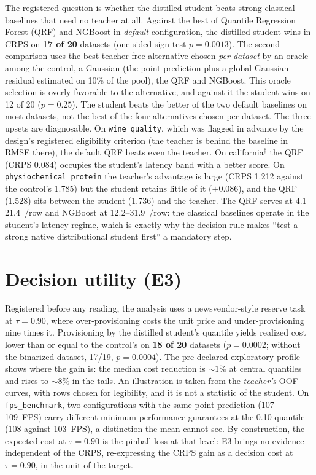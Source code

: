 The registered question is whether the distilled student beats
strong classical baselines that need no teacher at all. Against the
best of Quantile Regression Forest (QRF) and NGBoost in
\emph{default} configuration, the distilled student wins in CRPS on
\textbf{17 of 20} datasets (one-sided sign test $p=0.0013$). The
second comparison uses the best teacher-free alternative chosen
\emph{per dataset} by an oracle among the control, a
Gaussian (the point prediction plus a global Gaussian residual
estimated on 10\% of the pool), the QRF and NGBoost. This oracle
selection is overly favorable to the alternative, and against it the
student wins on 12 of 20 ($p=0.25$). The student beats the better of the two default baselines on most datasets, not the best of the four alternatives chosen per dataset. The three upsets are diagnosable. On
\texttt{wine\_quality}, which was flagged in advance by the design's registered
eligibility criterion (the teacher is behind the baseline in RMSE there),
the default QRF beats even the teacher. On california$^\dagger$ the QRF (CRPS 0.084) occupies
the student's latency band with a better score. On
\texttt{physiochemical\_\allowbreak protein} the teacher's advantage
is large (CRPS 1.212 against the control's 1.785) but the student
retains little of it ($+0.086$), and the QRF (1.528) sits between
the student (1.736) and the teacher. The QRF serves at
4.1--21.4~\us/row and NGBoost at 12.2--31.9~\us/row: the
classical baselines operate in the student's latency regime, which
is exactly why the decision rule makes ``test a strong native distributional student first'' a mandatory step.

\section{Decision utility (E3)}
\label{sec:destil-e3}

Registered before any reading, the analysis uses a
newsvendor-style reserve task at $\tau=0.90$, where over-provisioning
costs the unit price and under-provisioning nine times it.
Provisioning by the distilled student's quantile yields
realized cost lower than or equal to the control's on \textbf{18 of
20} datasets ($p=0.0002$; without the binarized dataset, 17/19,
$p=0.0004$). The pre-declared exploratory profile shows where the
gain is: the median cost reduction is ${\sim}1\%$ at central
quantiles and rises to ${\sim}8\%$ in the tails. An illustration is
taken from the \emph{teacher's} OOF curves, with rows chosen for
legibility, and it is not a statistic of the student. On
\texttt{fps\_benchmark}, two configurations with the same point
prediction (107--109~FPS) carry different minimum-performance
guarantees at the 0.10 quantile (108 against 103~FPS), a distinction
the mean cannot see. By construction, the expected cost at
$\tau=0.90$ is the pinball loss at that level: E3 brings
no evidence independent of the CRPS, re-expressing the CRPS gain
as a decision cost at $\tau=0.90$, in the unit of the target.

